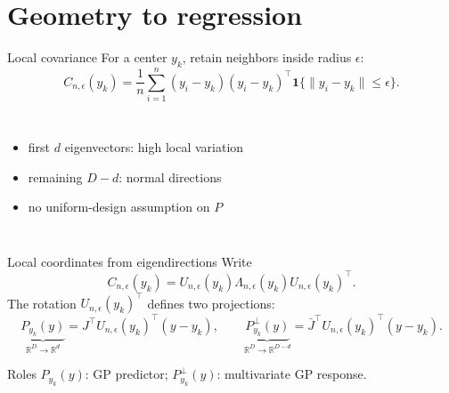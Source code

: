\documentclass[aspectratio=169,10pt]{beamer}
\newcommand{\R}{\mathbb R}
\begin{document}
\section{Geometry to regression}

\begin{frame}{Local covariance}
  For a center \(y_k\), retain neighbors inside radius \(\epsilon\):
  \[
    C_{n,\epsilon}(y_k)=
    \frac1n\sum_{i=1}^n
    (y_i-y_k)(y_i-y_k)^\top
    \mathbf 1\{\|y_i-y_k\|\leq\epsilon\}.
  \]
  \begin{columns}[T]
      \begin{itemize}
        \item first \(d\) eigenvectors: high local variation
        \item remaining \(D-d\): normal directions
        \item no uniform-design assumption on \(P\)
      \end{itemize}
      \begin{center}
      \end{center}
  \end{columns}
\end{frame}

\begin{frame}{Local coordinates from eigendirections}
  Write
  \[
    C_{n,\epsilon}(y_k)
      =U_{n,\epsilon}(y_k)\Lambda_{n,\epsilon}(y_k)
       U_{n,\epsilon}(y_k)^\top .
  \]
  The rotation \(U_{n,\epsilon}(y_k)^\top\) defines two projections:
  \[
    \underbrace{P_{y_k}(y)}_{\R^D\to\R^d}
      =J^\top U_{n,\epsilon}(y_k)^\top(y-y_k),
    \qquad
    \underbrace{P^\perp_{y_k}(y)}_{\R^D\to\R^{D-d}}
      =\bar J^\top U_{n,\epsilon}(y_k)^\top(y-y_k).
  \]
  \begin{alertblock}{Roles}
    \(P_{y_k}(y)\): GP predictor;\quad
    \(P^\perp_{y_k}(y)\): multivariate GP response.
  \end{alertblock}
\end{frame}
\end{document}
